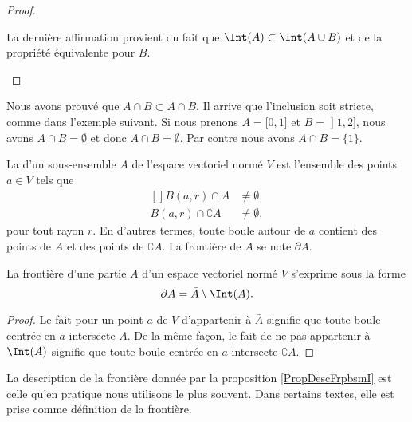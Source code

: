 \begin{proof}
\begin{enumerate}
			La dernière affirmation provient du fait que $\Int(A)\subset\Int(A\cup B)$ et de la propriété équivalente pour $B$.
	\end{enumerate}
\end{proof}

\begin{remark}
	Nous avons prouvé que $\overline{ A\cap B }\subset\bar A\cap\bar B$. Il arrive que l'inclusion soit stricte, comme dans l'exemple suivant. Si nous prenons $A=\mathopen[ 0 , 1 \mathclose]$ et $B=\mathopen] 1 , 2 \mathclose]$, nous avons $A\cap B=\emptyset$ et donc $\overline{ A\cap B }=\emptyset$. Par contre nous avons $\bar A\cap\bar B=\{ 1 \}$.
\end{remark}

\begin{definition}
	La  d'un sous-ensemble $A$ de l'espace vectoriel normé $V$ est l'ensemble des points $a\in V$ tels que
	\begin{equation}
		\begin{aligned}[]
			B(a,r)\cap A&\neq \emptyset,\\
			B(a,r)\cap \complement A&\neq \emptyset,
		\end{aligned}
	\end{equation}
	pour tout rayon $r$. En d'autres termes, toute boule autour de $a$ contient des points de $A$ et des points de $\complement A$. La frontière de $A$ se note $\partial A$.
\end{definition}

\begin{proposition}		\label{PropDescFrpbsmI}
	La frontière d'une partie $A$ d'un espace vectoriel normé $V$ s'exprime sous la forme
	\begin{equation}
		\partial A=\bar A\setminus\Int(A).
	\end{equation}
\end{proposition}

\begin{proof}
	Le fait pour un point $a$ de $V$ d'appartenir à $\bar A$ signifie que toute boule centrée en $a$ intersecte $A$. De la même façon, le fait de ne pas appartenir à $\Int(A)$ signifie que toute boule centrée en $a$ intersecte $\complement A$.
\end{proof}

La description de la frontière donnée par la proposition \ref{PropDescFrpbsmI} est celle qu'en pratique nous utilisons le plus souvent. Dans certains textes, elle est prise comme définition de la frontière.

